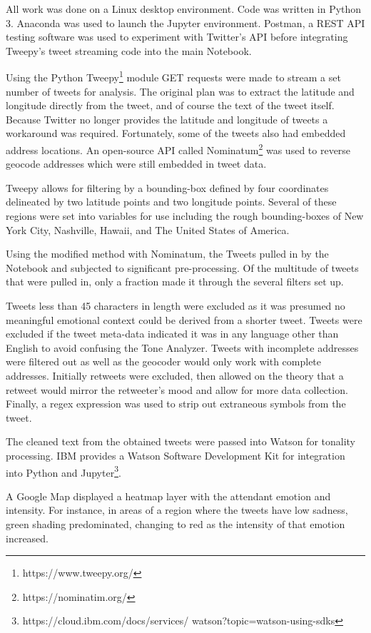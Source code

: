 \documentclass[12pt, oneside]{article}
\begin{document}
All work was done on a Linux desktop environment. Code was written in Python
3. Anaconda was used to launch the Jupyter environment. Postman, a REST API
testing software was used to experiment with Twitter's
API\cite{Postman} before integrating Tweepy's tweet streaming code into the
main Notebook.

Using the Python Tweepy\footnote{https://www.tweepy.org/} module GET requests
were made to stream a set number of
tweets for analysis. The original plan was to extract the latitude and
longitude directly from the tweet, and of course
the text of the tweet itself. Because Twitter no longer provides the latitude
and longitude of tweets a workaround was required. Fortunately, some of the
tweets also had embedded address locations. An open-source API called
Nominatum\footnote{https://nominatim.org/} was used to reverse geocode
addresses which were still embedded in tweet data.

Tweepy allows for filtering by a bounding-box defined by four coordinates
delineated by two latitude points and two longitude points. Several of these
regions were set into variables for use including the rough bounding-boxes of
New York City, Nashville, Hawaii, and The United States of America.

Using the modified method with Nominatum, the Tweets pulled in by the Notebook
and subjected to significant pre-processing. Of the multitude of tweets that
were pulled in, only a fraction made it through the several filters set up.

Tweets less than 45 characters in length were excluded as it was presumed no
meaningful emotional context could be derived from a shorter tweet.
Tweets were excluded if the tweet meta-data indicated it was in any language
other than English to avoid confusing the Tone Analyzer. Tweets with incomplete
addresses were filtered out as well as the geocoder would only work with
complete addresses. Initially retweets were excluded, then allowed on the
theory that a retweet would mirror the retweeter's mood and allow for more data
collection. Finally, a regex expression was used to strip out extraneous
symbols from the tweet.

The cleaned text from the obtained tweets were passed into Watson for tonality
processing. IBM provides a Watson Software Development Kit for integration into
Python and Jupyter\footnote{https://cloud.ibm.com/docs/services/
watson?topic=watson-using-sdks}.

A Google Map displayed a heatmap layer with the attendant emotion and
intensity. For instance, in areas of a region where the tweets have low
sadness, green shading predominated, changing to red as the intensity of
that emotion increased.
\end{document}
